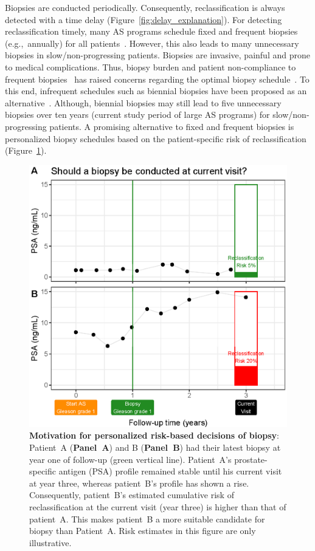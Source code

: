 Biopsies are conducted periodically. Consequently, reclassification is always detected with a time delay (Figure~\ref{fig:delay_explanation}). For detecting reclassification timely, many AS programs schedule fixed and frequent biopsies (e.g.,~annually) for all patients~\citep{nieboer2018active,loeb2014heterogeneity}. However, this also leads to many unnecessary biopsies in slow/non-progressing patients. Biopsies are invasive, painful and prone to medical complications. Thus, biopsy burden and patient non-compliance to frequent biopsies~\citep{bokhorst2015compliance} has raised concerns regarding the optimal biopsy schedule~\citep{inoue2018comparative, bratt2013study}. To this end, infrequent schedules such as biennial biopsies have been proposed as an alternative~\citep{inoue2018comparative,de2017estimating}. Although, biennial biopsies may still lead to five unnecessary biopsies over ten years (current study period of large AS programs) for slow/non-progressing patients. A promising alternative to fixed and frequent biopsies is personalized biopsy schedules based on the patient-specific risk of reclassification (Figure~\ref{fig:riskBasedExample}).

\begin{figure}
\centerline{\includegraphics[width=\columnwidth]{images/riskBasedExample.eps}}
\caption{\textbf{Motivation for personalized risk-based decisions of biopsy}: Patient~A (\textbf{Panel~A}) and B (\textbf{Panel~B}) had their latest biopsy at year one of follow-up (green vertical line). Patient~A's prostate-specific antigen (PSA) profile remained stable until his current visit at year three, whereas patient~B's profile has shown a rise. Consequently, patient~B's estimated cumulative risk of reclassification at the current visit (year three) is higher than that of patient~A. This makes patient~B a more suitable candidate for biopsy than Patient~A. Risk estimates in this figure are only illustrative.}
\label{fig:riskBasedExample}
\end{figure}

